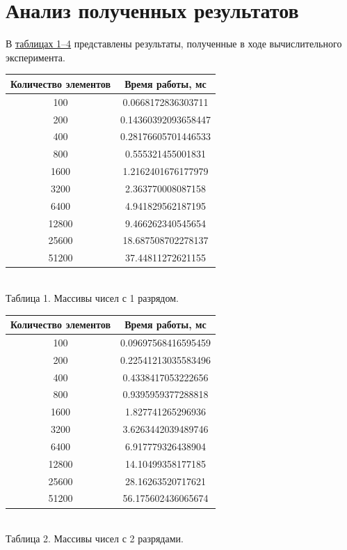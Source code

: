 \documentclass[a4paper]{article}
\begin{document}
\section{Анализ полученных результатов}
В \hyperref[table1]{таблицах 1–4} представлены результаты, полученные в ходе вычислительного эксперимента.
\begin{center}
	\label{table1}
\begin{tabular}{|c|c|}
	\hline
	Количество элементов & Время работы, мс \\
	\hline
	100 & 0.0668172836303711 \\ \hline
	200 & 0.14360392093658447 \\ \hline
	400 & 0.28176605701446533 \\ \hline
	800 & 0.555321455001831 \\ \hline
	1600 & 1.2162401676177979 \\ \hline
	3200 & 2.363770008087158 \\ \hline
	6400 & 4.941829562187195 \\ \hline
	12800 & 9.466262340545654 \\ \hline
	25600 & 18.687508702278137 \\ \hline
	51200 & 37.44811272621155 \\ \hline
\end{tabular} \\
\hfill \break
	Таблица 1. Массивы чисел с 1 разрядом.
	\label{table2}
\begin{tabular}{|c|c|}
	\hline
	Количество элементов & Время работы, мс \\
	\hline
	100 & 0.09697568416595459 \\ \hline
    200 & 0.22541213035583496 \\ \hline
    400 & 0.4338417053222656 \\ \hline
    800 & 0.9395959377288818 \\ \hline
    1600 & 1.827741265296936 \\ \hline
    3200 & 3.6263442039489746 \\ \hline
    6400 & 6.917779326438904 \\ \hline
    12800 & 14.10499358177185 \\ \hline
    25600 & 28.16263520717621 \\ \hline
    51200 & 56.175602436065674 \\ \hline
\end{tabular} \\
\hfill \break
	Таблица 2. Массивы чисел с 2 разрядами.
	\break \hfill \break

\end{center}
\end{document}
